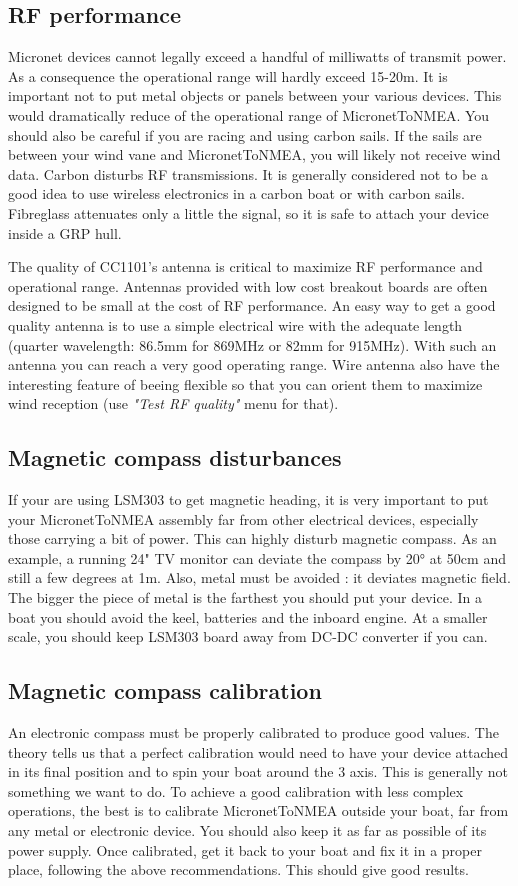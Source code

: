 \documentclass{report}
\begin{document}
\subsection{RF performance}
Micronet devices cannot legally exceed a handful of milliwatts of transmit power. As a consequence the operational range will hardly exceed 15-20m. It is important not to put metal objects or panels between your various devices. This would dramatically reduce of the operational range of MicronetToNMEA.
You should also be careful if you are racing and using carbon sails. If the sails are between your wind vane and MicronetToNMEA, you will likely not receive wind data. Carbon disturbs RF transmissions.
It is generally considered not to be a good idea to use wireless electronics in a carbon boat or with carbon sails. Fibreglass attenuates only a little the signal, so it is safe to attach your device inside a GRP hull.

The quality of CC1101's antenna is critical to maximize RF performance and operational range. Antennas provided with low cost breakout boards are often designed to be small at the cost of RF performance. An easy way to get a good quality antenna is to use a simple electrical wire with the adequate length (quarter wavelength: 86.5mm for 869MHz or 82mm for 915MHz). With such an antenna you can reach a very good operating range. Wire antenna also have the interesting feature of beeing flexible so that you can orient them to maximize wind reception (use \emph{"Test RF quality"} menu for that).

\subsection{Magnetic compass disturbances}
\label{compass-recommendations}
If your are using LSM303 to get magnetic heading, it is very important to put your MicronetToNMEA assembly far from other electrical devices, especially those carrying a bit of power. This can highly disturb magnetic compass. As an example, a running 24" TV monitor can deviate the compass by 20° at 50cm and still a few degrees at 1m.
Also, metal must be avoided : it deviates magnetic field. The bigger the piece of metal is the farthest you should put your device. In a boat you should avoid the keel, batteries and the inboard engine. At a smaller scale, you should keep LSM303 board away from DC-DC converter if you can.

\subsection{Magnetic compass calibration}
An electronic compass must be properly calibrated to produce good values. The theory tells us that a perfect calibration would need to have your device attached in its final position and to spin your boat around the 3 axis. This is generally not something we want to do. To achieve a good calibration with less complex operations, the best is to calibrate MicronetToNMEA outside your boat, far from any metal or electronic device. You should also keep it as far as possible of its power supply. Once calibrated, get it back to your boat and fix it in a proper place, following the above recommendations. This should give good results.
\end{document}
